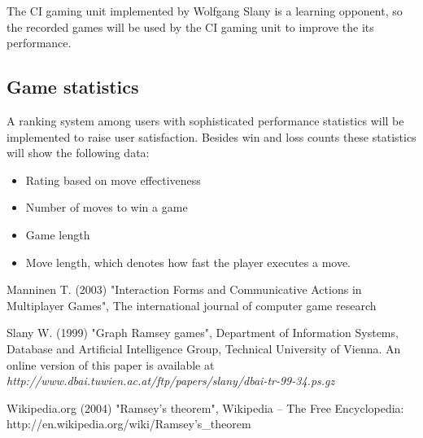 		The CI gaming unit implemented by Wolfgang Slany is a learning opponent,
		so the recorded games will be used by the CI gaming unit to improve the
		its performance.

	\subsection{Game statistics}

		A ranking system among users with sophisticated performance statistics
		will be implemented to raise user satisfaction. Besides win and loss
		counts these statistics will show the following data:

		\begin{itemize}

			\item Rating based on move effectiveness

			\item Number of moves to win a game

			\item Game length

			\item Move length, which denotes how fast the player executes a move.

		\end{itemize}




\begin{thebibliography}{10}

	 Manninen T. (2003) "Interaction Forms and
	Communicative Actions in Multiplayer Games", The international journal of
	computer game research

	 Slany W. (1999) "Graph Ramsey games",
	Department of Information Systems, Database and Artificial Intelligence
	Group, Technical University of Vienna. An online version of this paper is
	available at
	\textit{http://www.dbai.tuwien.ac.at/ftp/papers/slany/dbai-tr-99-34.ps.gz}

	 Wikipedia.org (2004) "Ramsey's theorem", Wikipedia --
	The Free Encyclopedia: http://en.wikipedia.org/wiki/Ramsey's\_theorem

\end{thebibliography}


